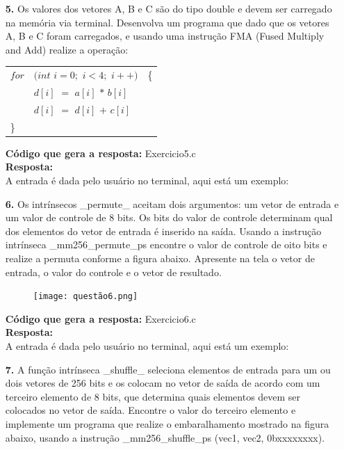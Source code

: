 \documentclass[oneside,a4paper,12pt]{article}
\renewcommand{\b}{\textbf}
\begin{document}
\begin{enumerate}
    \item[\b{5.}] Os valores dos vetores A, B e C são do tipo double e devem ser carregado na memória via terminal. Desenvolva um programa que dado que os vetores A, B e C foram carregados, e usando uma instrução FMA (Fused Multiply and Add) realize a operação:
    
    \begin{center}
    \begin{tabular}{cll}
    $for$ & $(int$ $i = 0;$ $i < 4;$ $i++)$ & \{ \\
          & $d[i]$ $=$ $a[i]$ $*$ $b[i]$ & \\
          & $d[i]$ $=$ $d[i]$ $+$ $c[i]$ & \\
    \multicolumn{1}{l}{\}} &  &
    \end{tabular}
    \end{center}
    
    \b{Código que gera a resposta:} Exercicio5.c\\
    \b{Resposta:}\\
    A entrada é dada pelo usuário no terminal, aqui está um exemplo:\\
    
   \item[\b{6.}] Os intrínsecos \_permute\_ aceitam dois argumentos: um vetor de entrada e um valor de controle de 8 bits. Os bits do valor de controle determinam qual dos elementos do vetor de entrada é inserido na saída. Usando a instrução intrínseca \_mm256\_permute\_ps encontre o valor de controle de oito bits e realize a permuta conforme a figura abaixo. Apresente na tela o vetor de entrada, o valor do controle e o vetor de resultado.
   
    \begin{figure}[H]
    \centering
    \texttt{[image: questão6.png]}
    \label{fig:Figura1}
    \end{figure}
   
   \b{Código que gera a resposta:} Exercicio6.c\\
   \b{Resposta:}\\
   A entrada é dada pelo usuário no terminal, aqui está um exemplo:\\
   
   \item[\b{7.}] A função intrínseca \_shuffle\_ seleciona elementos de entrada para um ou dois vetores de 256 bits e os colocam no vetor de saída de acordo com um terceiro elemento de 8 bits, que determina quais elementos devem ser colocados no vetor de saída. Encontre o valor do terceiro elemento e implemente um programa que realize o embaralhamento mostrado na figura abaixo, usando a instrução \_mm256\_shuffle\_ps (vec1, vec2, 0bxxxxxxxx).
   

\end{enumerate}
\end{document}
